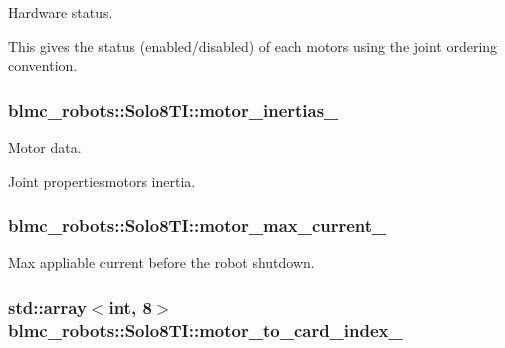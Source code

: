 Hardware status. 

This gives the status (enabled/disabled) of each motors using the joint ordering convention. 
\subsubsection[{\texorpdfstring{motor\+\_\+inertias\+\_\+}{motor_inertias_}}]{ blmc\+\_\+robots\+::\+Solo8\+T\+I\+::motor\+\_\+inertias\+\_\+\hspace{0.3cm}{\ttfamily [private]}}\hypertarget{classblmc__robots_1_1Solo8TI_a59f11040a17d232823756c26c6b68145}{}\label{classblmc__robots_1_1Solo8TI_a59f11040a17d232823756c26c6b68145}


Motor data. 

Joint propertiesmotors inertia. 
\subsubsection[{\texorpdfstring{motor\+\_\+max\+\_\+current\+\_\+}{motor_max_current_}}]{ blmc\+\_\+robots\+::\+Solo8\+T\+I\+::motor\+\_\+max\+\_\+current\+\_\+\hspace{0.3cm}{\ttfamily [private]}}\hypertarget{classblmc__robots_1_1Solo8TI_afc3ba4524871faadbc1150f40e013f95}{}\label{classblmc__robots_1_1Solo8TI_afc3ba4524871faadbc1150f40e013f95}


Max appliable current before the robot shutdown. 

\subsubsection[{\texorpdfstring{motor\+\_\+to\+\_\+card\+\_\+index\+\_\+}{motor_to_card_index_}}]{\setlength{\rightskip}{0pt plus 5cm}std\+::array$<$int, 8$>$ blmc\+\_\+robots\+::\+Solo8\+T\+I\+::motor\+\_\+to\+\_\+card\+\_\+index\+\_\+\hspace{0.3cm}{\ttfamily [private]}}\hypertarget{classblmc__robots_1_1Solo8TI_a1287fd44d615eec9d3333f186adb18ec}{}\label{classblmc__robots_1_1Solo8TI_a1287fd44d615eec9d3333f186adb18ec}



